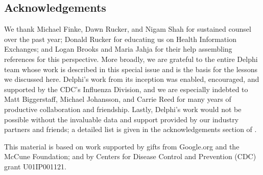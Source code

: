 \documentclass{article}
\begin{document}
\subsection*{Acknowledgements} 

We thank Michael Finke, Dawn Rucker, and Nigam Shah for sustained counsel over 
the past year; Donald Rucker for educating us on Health Information Exchanges;
and Logan Brooks and Maria Jahja for their help assembling references for this
perspective. More broadly, we are grateful to the entire Delphi team whose work
is described in this special issue and is the basis for the lessons we discussed
here. Delphi's work from its inception was enabled, encouraged, and supported by 
the CDC's Influenza Division, and we are especially indebted to Matt
Biggerstaff, Michael Johansson, and Carrie Reed for many years of productive
collaboration and friendship. Lastly, Delphi's work would not be possible
without the invaluable data and support provided by our industry partners and
friends; a detailed list is given in the acknowledgements section of
\citep{Reinhart:2021}. 

This material is based on work supported by gifts from Google.org and the McCune  
Foundation; and by Centers for Disease Control and Prevention (CDC) grant
U01IP001121.



\end{document}
